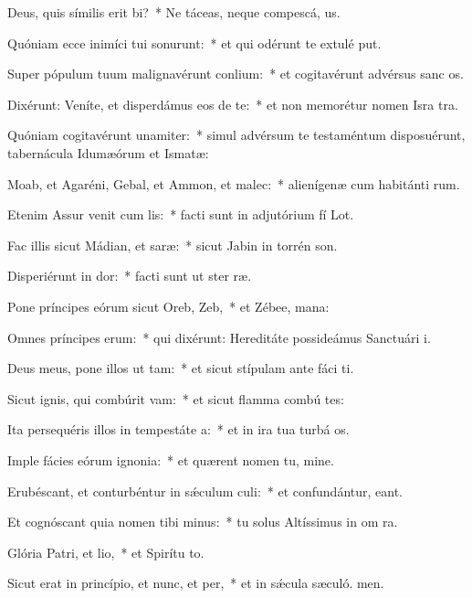 \item Deus, quis símilis erit bi?~* Ne táceas, neque compescá, us.
\item Quóniam ecce inimíci tui sonurunt:~* et qui odérunt te extulé put.
\item Super pópulum tuum malignavérunt conlium:~* et cogitavérunt advérsus sanc os.
\item Dixérunt: Veníte, et disperdámus eos de te:~* et non memorétur nomen Isra tra.
\item Quóniam cogitavérunt unamiter:~* simul advérsum te testaméntum disposuérunt, tabernácula Idumæórum et Ismatæ:
\item Moab, et Agaréni, Gebal, et Ammon, et malec:~* alienígenæ cum habitánti rum.
\item Etenim Assur venit cum lis:~* facti sunt in adjutórium fí Lot.
\item Fac illis sicut Mádian, et saræ:~* sicut Jabin in torrén son.
\item Disperiérunt in dor:~* facti sunt ut ster ræ.
\item Pone príncipes eórum sicut Oreb,  Zeb,~* et Zébee,  mana:
\item Omnes príncipes erum:~* qui dixérunt: Hereditáte possideámus Sanctuári i.
\item Deus meus, pone illos ut tam:~* et sicut stípulam ante fáci ti.
\item Sicut ignis, qui combúrit vam:~* et sicut flamma combú tes:
\item Ita persequéris illos in tempestáte a:~* et in ira tua turbá os.
\item Imple fácies eórum ignonia:~* et quærent nomen tu, mine.
\item Erubéscant, et conturbéntur in sǽculum culi:~* et confundántur,  eant.
\item Et cognóscant quia nomen tibi minus:~* tu solus Altíssimus in om ra.
\item Glória Patri, et lio,~* et Spirítu to.
\item Sicut erat in princípio, et nunc, et per,~* et in sǽcula sæculó. men.
